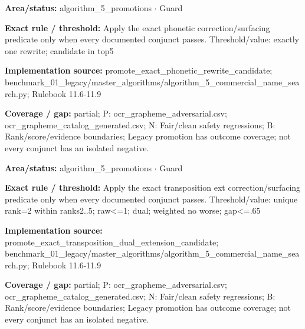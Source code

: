 \begin{tcolorbox}[enhanced,breakable,colback=white,colframe=Muted!45,boxrule=0.45pt,arc=1.5pt,left=6pt,right=6pt,top=5pt,bottom=5pt,title={\texttt{A5-PROMOTE-EXACT-PHONETIC}},title after break={\texttt{A5-PROMOTE-EXACT-PHONETIC}\ (continued)},fonttitle=\headingfont\bfseries\color{Navy},coltitle=Navy]
\textbf{Area/status:} algorithm\_\allowbreak{}5\_\allowbreak{}promotions $\boldsymbol{\cdot}$ Guard\par
\smallskip
\textbf{Exact rule / threshold:} Apply the exact phonetic correction/\allowbreak{}surfacing predicate only when every documented conjunct passes. Threshold/\allowbreak{}value: exactly one rewrite; candidate in top5\par
\smallskip
\textbf{Implementation source:} promote\_\allowbreak{}exact\_\allowbreak{}phonetic\_\allowbreak{}rewrite\_\allowbreak{}candidate; benchmark\_\allowbreak{}01\_\allowbreak{}legacy/\allowbreak{}master\_\allowbreak{}algorithms/\allowbreak{}algorithm\_\allowbreak{}5\_\allowbreak{}commercial\_\allowbreak{}name\_\allowbreak{}search.py; Rulebook 11.6-11.9\par
\smallskip
\textbf{Coverage / gap:} partial; P: ocr\_\allowbreak{}grapheme\_\allowbreak{}adversarial.csv; ocr\_\allowbreak{}grapheme\_\allowbreak{}catalog\_\allowbreak{}generated.csv; N: Fair/\allowbreak{}clean safety regressions; B: Rank/\allowbreak{}score/\allowbreak{}evidence boundaries; Legacy promotion has outcome coverage; not every conjunct has an isolated negative.
\end{tcolorbox}
\begin{tcolorbox}[enhanced,breakable,colback=white,colframe=Muted!45,boxrule=0.45pt,arc=1.5pt,left=6pt,right=6pt,top=5pt,bottom=5pt,title={\texttt{A5-PROMOTE-EXACT-TRANSPOSITION-EXT}},title after break={\texttt{A5-PROMOTE-EXACT-TRANSPOSITION-EXT}\ (continued)},fonttitle=\headingfont\bfseries\color{Navy},coltitle=Navy]
\textbf{Area/status:} algorithm\_\allowbreak{}5\_\allowbreak{}promotions $\boldsymbol{\cdot}$ Guard\par
\smallskip
\textbf{Exact rule / threshold:} Apply the exact transposition ext correction/\allowbreak{}surfacing predicate only when every documented conjunct passes. Threshold/\allowbreak{}value: unique rank=2 within ranks2..5; raw<=1; dual; weighted no worse; gap<=.65\par
\smallskip
\textbf{Implementation source:} promote\_\allowbreak{}exact\_\allowbreak{}transposition\_\allowbreak{}dual\_\allowbreak{}extension\_\allowbreak{}candidate; benchmark\_\allowbreak{}01\_\allowbreak{}legacy/\allowbreak{}master\_\allowbreak{}algorithms/\allowbreak{}algorithm\_\allowbreak{}5\_\allowbreak{}commercial\_\allowbreak{}name\_\allowbreak{}search.py; Rulebook 11.6-11.9\par
\smallskip
\textbf{Coverage / gap:} partial; P: ocr\_\allowbreak{}grapheme\_\allowbreak{}adversarial.csv; ocr\_\allowbreak{}grapheme\_\allowbreak{}catalog\_\allowbreak{}generated.csv; N: Fair/\allowbreak{}clean safety regressions; B: Rank/\allowbreak{}score/\allowbreak{}evidence boundaries; Legacy promotion has outcome coverage; not every conjunct has an isolated negative.
\end{tcolorbox}
